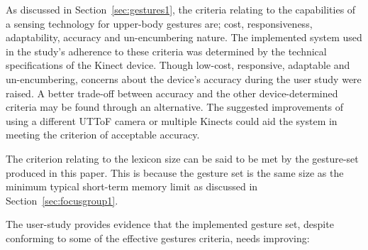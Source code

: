 \documentclass[manuscript, review, screen]{acmart}
\begin{document}
As discussed in Section~\ref{sec:gestures1}, the criteria relating to the capabilities of a sensing technology for upper-body gestures are; cost, responsiveness, adaptability, accuracy and un-encumbering nature.
The implemented system used in the study's adherence to these criteria was determined by the technical specifications of the Kinect device.
Though low-cost, responsive, adaptable and un-encumbering, concerns about the device's accuracy during the user study were raised.
A better trade-off between accuracy and the other device-determined criteria may be found through an alternative.
The suggested improvements of using a different \ac{UTToF} camera or multiple Kinects could aid the system in meeting the criterion of acceptable accuracy.

The criterion relating to the lexicon size can be said to be met by the gesture-set produced in this paper.
This is because the gesture set is the same size as the minimum typical short-term memory limit as discussed in Section~\ref{sec:focusgroup1}.

The user-study provides evidence that the implemented gesture set, despite conforming to some of the effective gestures criteria, needs improving:
\end{document}
